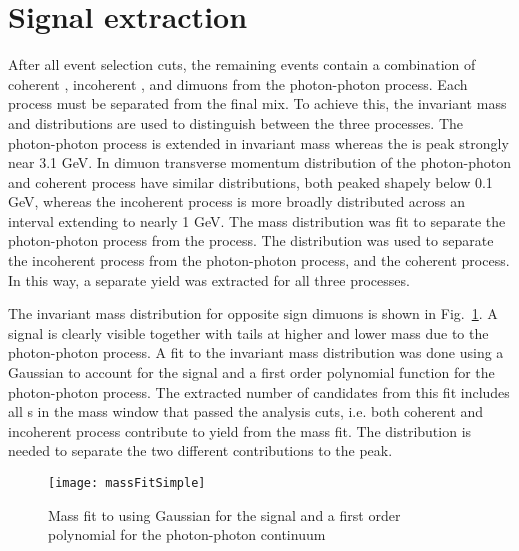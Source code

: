   \section{\label{sec:sigEx} Signal extraction}
    After all event selection cuts, the remaining events contain a combination 
      of coherent \JPsi{}, incoherent \JPsi{}, and dimuons from the 
      photon-photon process.
    Each process must be separated from the final mix.
    To achieve this, the invariant mass and \pt{} distributions are used 
      to distinguish between the three processes. 
    The photon-photon process is extended in invariant mass whereas the 
      \JPsi{} is peak strongly near 3.1 GeV.
    In dimuon transverse momentum distribution of the photon-photon and 
      coherent process have similar distributions, both peaked shapely below 
        0.1 GeV, whereas the incoherent process is more broadly distributed 
        across an interval extending to nearly 1 GeV.
    The mass distribution was fit to separate the photon-photon process from
      the \JPsi{} process.
    The \pt{} distribution was used to separate the incoherent process from 
      the photon-photon process, and the coherent process. 
    In this way, a separate yield was extracted for all three processes. 
    
    The invariant mass distribution for opposite sign dimuons is shown in 
      Fig.~\ref{fig:massFit}. 
    A \JPsi{} signal is clearly visible together with tails at higher and
      lower mass due to the photon-photon process.
    A fit to the invariant mass distribution was done using a Gaussian
      to account for the \JPsi{} signal and a first order polynomial function 
      for the photon-photon process.
    The extracted number of \JPsi{} candidates from this fit includes all 
      \JPsi{}s in the mass window that passed the analysis cuts, i.e. both
      coherent and incoherent process contribute to yield from the mass
      fit.
    The \pt{} distribution is needed to separate the two different 
      contributions to the \JPsi{} peak. 

    \begin{figure}[!Hhtb]
      \centering
      \texttt{[image: massFitSimple]}
      \caption{Mass fit to \JPsi{} using Gaussian for the 
        signal and a first order polynomial for the photon-photon continuum}
      \label{fig:massFit}
    \end{figure}
  
